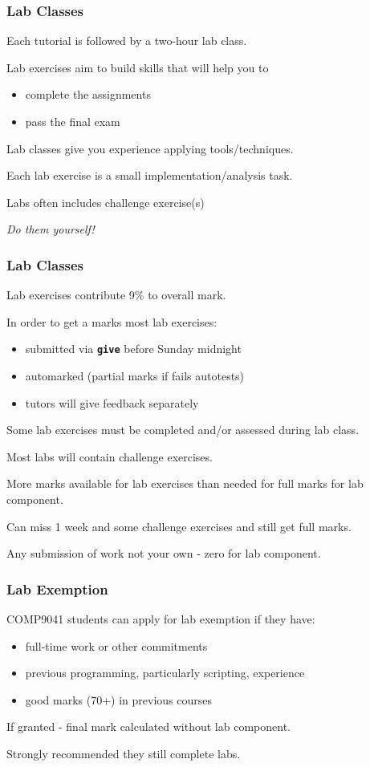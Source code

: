 \begin{frame}
\frametitle{Lab Classes}
Each tutorial is followed by a two-hour lab class.

Lab exercises aim to build skills that will help you to

\begin{itemize}
\item  complete the assignments
\item  pass the final exam
\end{itemize}

Lab classes give you experience applying tools/techniques.

Each lab exercise is a small implementation/analysis task.

Labs often includes challenge exercise(s)

{\em{Do them yourself!}} 
\end{frame}

\begin{frame}
\frametitle{Lab Classes}
Lab exercises contribute 9\% to overall mark.

In order to get a marks most lab exercises:

\begin{itemize}
\item submitted via \textbf{\tt{give}} before Sunday midnight
\item automarked (partial marks if fails autotests)
\item tutors will give feedback separately
\end{itemize}

Some lab exercises must be completed and/or assessed during lab class.

Most labs will contain challenge exercises.

More marks available for lab exercises than needed for full marks for lab component.

Can miss 1 week and some challenge exercises and still get full marks.

Any submission of work not your own - zero for lab component.

\end{frame}

\begin{frame}
\frametitle{Lab Exemption}
COMP9041 students can apply for lab exemption if they have:

\begin{itemize}
\item  full-time work or other commitments
\item  previous  programming, particularly scripting, experience
\item  good marks (70+) in previous courses
\end{itemize}

If granted - final mark calculated without lab component.

Strongly recommended they still  complete labs.

\end{frame}

